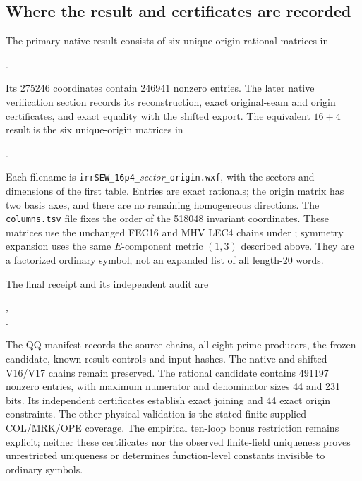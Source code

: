 \documentclass[11pt]{article}
\begin{document}
\subsection{Where the result and certificates are recorded}
The primary native result consists of six unique-origin rational matrices in
\begin{center}
.
\end{center}
Its 275246 coordinates contain 246941 nonzero entries. The later native
verification section records its reconstruction, exact original-seam and
origin certificates, and exact equality with the shifted export.
The equivalent $16+4$ result is the six unique-origin matrices in
\begin{center}
.
\end{center}
Each filename is \texttt{irrSEW\_16p4\_}\emph{sector}\texttt{\_origin.wxf},
with the sectors and dimensions of the first table. Entries are exact
rationals; the origin matrix has two basis axes, and there are no remaining
homogeneous directions. The \texttt{columns.tsv} file fixes the order of the
518048 invariant coordinates. These matrices use the unchanged FEC16 and
MHV LEC4 chains under ; symmetry expansion
uses the same $E$-component metric $(1,3)$ described above. They are a
factorized ordinary symbol, not an expanded list of all length-20 words.

The final receipt and its independent audit are
\begin{center}
,\\
.
\end{center}
The QQ manifest records the source chains, all eight prime producers, the
frozen candidate, known-result controls and input hashes. The native and
shifted V16/V17 chains remain preserved. The rational candidate contains
491197 nonzero entries, with maximum numerator and denominator sizes
44 and 231 bits. Its independent certificates establish exact joining and
44 exact origin constraints. The other physical validation is the stated
finite supplied COL/MRK/OPE coverage. The empirical ten-loop bonus
restriction remains explicit; neither these certificates nor the observed
finite-field uniqueness proves unrestricted uniqueness or determines
function-level constants invisible to ordinary symbols.
\end{document}
